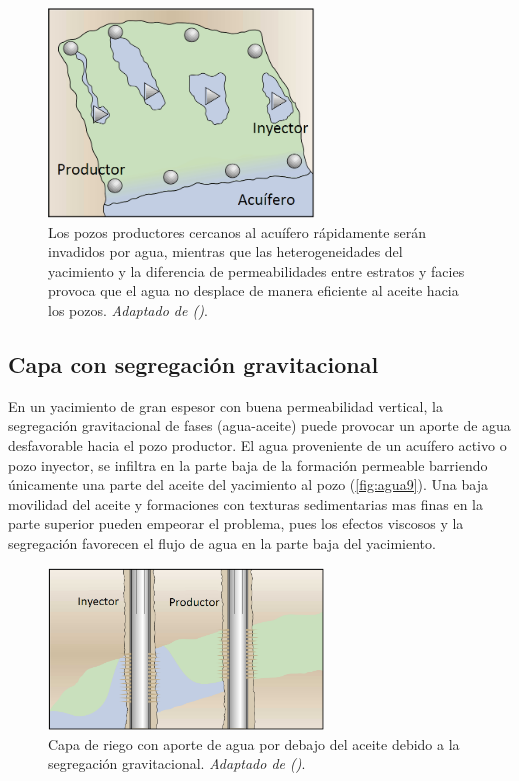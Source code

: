 \begin{figure}\centering
    \includegraphics[width=0.63\textwidth]{Graphics/agua8.png}
    \caption[Barrido areal deficiente]{Los pozos productores cercanos al acuífero rápidamente serán invadidos por agua, mientras que las heterogeneidades del yacimiento y la diferencia de permeabilidades entre estratos y facies provoca que el agua no desplace de manera eficiente al aceite hacia los pozos. \emph{Adaptado de (\cite{Bailey2000})}.}
    \label{fig:agua8}
\end{figure}

\subsection{Capa con segregación gravitacional}
En un yacimiento de gran espesor con buena permeabilidad vertical, la segregación gravitacional de fases (agua-aceite) puede provocar un aporte de agua desfavorable hacia el pozo productor. El agua proveniente de un acuífero activo o pozo inyector, se infiltra en la parte baja de la formación permeable barriendo únicamente una parte del aceite del yacimiento al pozo (\autoref{fig:agua9}). Una baja movilidad del aceite y formaciones con texturas sedimentarias mas finas en la parte superior pueden empeorar el problema, pues los efectos viscosos y la segregación favorecen el flujo de agua en la parte baja del yacimiento.

\begin{figure}\centering
    \includegraphics[width=0.65\textwidth]{Graphics/agua9.png}
    \caption[Capa con segregación gravitatacional]{Capa de riego con aporte de agua por debajo del aceite debido a la segregación gravitacional. \emph{Adaptado de (\cite{Bailey2000})}.}
    \label{fig:agua9}
\end{figure}

